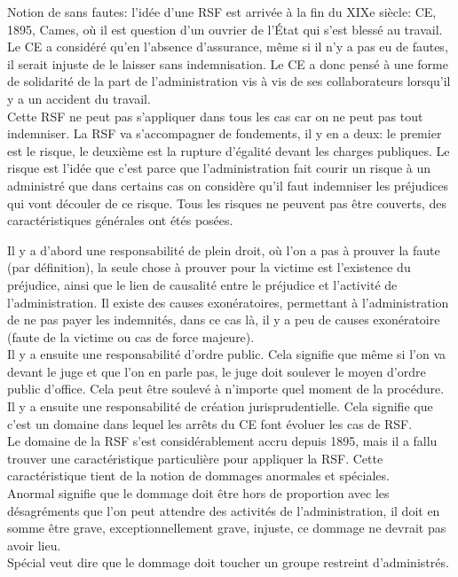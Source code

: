 \documentclass[10pt, a4paper, openany]{book}
\begin{document}
Notion de sans fautes: l'idée d'une RSF est arrivée à la fin du XIXe siècle: CE, 1895, Cames, où il est question d'un ouvrier de l'État qui s'est blessé au travail. Le CE a considéré qu'en l'absence d'assurance, même si il n'y a pas eu de fautes, il serait injuste de le laisser sans indemnisation. Le CE a donc pensé à une forme de solidarité de la part de l'administration vis à vis de ses collaborateurs lorsqu'il y a un accident du travail. \\
Cette RSF ne peut pas s'appliquer dans tous les cas car on ne peut pas tout indemniser. La RSF va s'accompagner de fondements, il y en a deux: le premier est le risque, le deuxième est la rupture d'égalité devant les charges publiques. Le risque est l'idée que c'est parce que l'administration fait courir un risque à un administré que dans certains cas on considère qu'il faut indemniser les préjudices qui vont découler de ce risque. Tous les risques ne peuvent pas être couverts, des caractéristiques générales ont étés posées.


Il y a d'abord une responsabilité de plein droit, où l'on a pas à prouver la faute (par définition), la seule chose à prouver pour la victime est l'existence du préjudice, ainsi que le lien de causalité entre le préjudice et l'activité de l'administration. Il existe des causes exonératoires, permettant à l'administration de ne pas payer les indemnités, dans ce cas là, il y a peu de causes exonératoire (faute de la victime ou cas de force majeure). \\
Il y a ensuite une responsabilité d'ordre public. Cela signifie que même si l'on va devant le juge et que l'on en parle pas, le juge doit soulever le moyen d'ordre public d'office. Cela peut être soulevé à n'importe quel moment de la procédure. \\
Il y a ensuite une responsabilité de création jurisprudentielle. Cela signifie que c'est un domaine dans lequel les arrêts du CE font évoluer les cas de RSF. \\
Le domaine de la RSF s'est considérablement accru depuis 1895, mais il a fallu trouver une caractéristique particulière pour appliquer la RSF. Cette caractéristique tient de la notion de dommages anormales et spéciales. \\
Anormal signifie que le dommage doit être hors de proportion avec les désagréments que l'on peut attendre des activités de l'administration, il doit en somme être grave, exceptionnellement grave, injuste, ce dommage ne devrait pas avoir lieu. \\
Spécial veut dire que le dommage doit toucher un groupe restreint d'administrés. 
\end{document}
